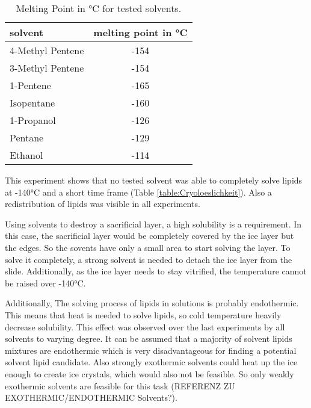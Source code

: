 \begin{table}[hbt!]
	\centering
	\begin{tabular}{|l|c|}
		\hline
		solvent & melting point in °C \\
		\hline
		\hline
		4-Methyl Pentene & -154 \\ 
		\hline
		3-Methyl Pentene & -154 \\
		\hline
		1-Pentene & -165 \\
		\hline
		Isopentane & -160 \\
		\hline
		1-Propanol & -126 \\
		\hline
		Pentane & -129 \\
		\hline
		Ethanol & -114 \\
		\hline
	\end{tabular}
	\caption{Melting Point in °C for tested solvents.}
	\label{table:SchmelztemperaturLösungsmittel}
\end{table}

This experiment shows that no tested solvent was able to completely solve lipids at -140°C and a short time frame (Table \ref{table:Cryoloeslichkeit}). Also a redistribution of lipids was visible in all experiments.

Using solvents to destroy a sacrificial layer, a high solubility is a requirement. In this case, the sacrificial layer would be completely covered by the ice layer but the edges. So the sovents have only a small area to start solving the layer. To solve it completely, a strong solvent is needed to detach the ice layer from the slide. Additionally, as the ice layer needs to stay vitrified, the temperature cannot be raised over -140°C. 

Additionally, The solving process of lipids in solutions is probably endothermic. This means that heat is needed to solve lipids, so cold temperature heavily decrease solubility. This effect was observed over the last experiments by all solvents to varying degree. It can be assumed that a majority of solvent lipids mixtures are endothermic which is very disadvantageous for finding a potential solvent lipid candidate. Also strongly exothermic solvents could heat up the ice enough to create ice crystals, which would also not be feasible. So only weakly exothermic solvents are feasible for this task (REFERENZ ZU EXOTHERMIC/ENDOTHERMIC Solvents?). 

